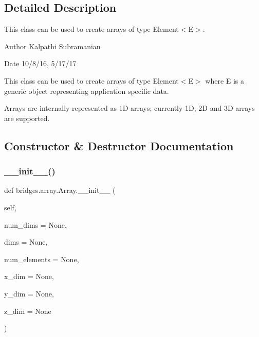 \subsection{Detailed Description}
This class can be used to create arrays of type Element$<$\+E$>$. 

\begin{DoxyAuthor}{Author}
Kalpathi Subramanian
\end{DoxyAuthor}
\begin{DoxyDate}{Date}
10/8/16, 5/17/17
\end{DoxyDate}
This class can be used to create arrays of type Element$<$\+E$>$ where E is a generic object representing application specific data.

Arrays are internally represented as 1D arrays; currently 1D, 2D and 3D arrays are supported. 

\subsection{Constructor \& Destructor Documentation}
\mbox{\label{classbridges_1_1array_1_1_array_a72ca451990833d3a58c7eee6811009ad}} 
\subsubsection{\texorpdfstring{\+\_\+\+\_\+init\+\_\+\+\_\+()}{\_\_init\_\_()}}
{\footnotesize\ttfamily def bridges.\+array.\+Array.\+\_\+\+\_\+init\+\_\+\+\_\+ (\begin{DoxyParamCaption}\item[{}]{self,  }\item[{}]{num\+\_\+dims = {\ttfamily None},  }\item[{}]{dims = {\ttfamily None},  }\item[{}]{num\+\_\+elements = {\ttfamily None},  }\item[{}]{x\+\_\+dim = {\ttfamily None},  }\item[{}]{y\+\_\+dim = {\ttfamily None},  }\item[{}]{z\+\_\+dim = {\ttfamily None} }\end{DoxyParamCaption})}



